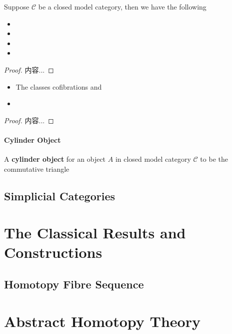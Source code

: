 \documentclass[Total.tex]{subfiles}
\begin{document}
				\begin{lemma}
					Suppose $\mathcal{C}$ be a closed model category, then we have the following
					\begin{itemize}
						\item 
						\item 
						\item 
						\item 
					\end{itemize}
				\end{lemma}
				\begin{proof}
					内容...
				\end{proof}
				
				\begin{corollary}
					\begin{itemize}
						\item The classes cofibrations and 
						\item 
					\end{itemize}
				\end{corollary}
				\begin{proof}
					内容...
				\end{proof}
				\subsubsection{Cylinder Object}
				\begin{Def}
					A \textbf{cylinder object} for an object $A$ in closed model category $\mathcal{C}$ to be the commutative triangle
					\begin{center}
						\begin{tikzcd}
							
						\end{tikzcd}
					\end{center}
				\end{Def}
		\section{Simplicial Categories}
			
	\chapter{The Classical Results and Constructions}
		\section{Homotopy Fibre Sequence}
	\chapter{Abstract Homotopy Theory}
\end{document}
